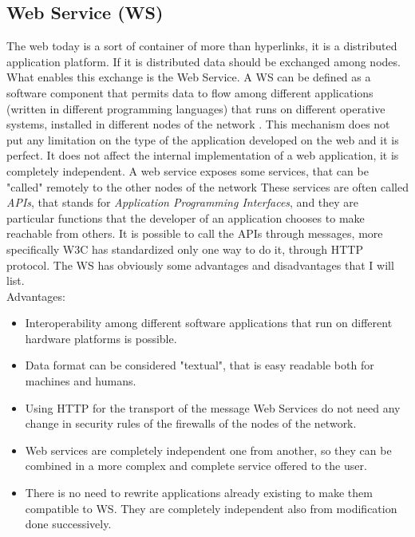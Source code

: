 \subsection{Web Service (WS)} 
The web today is a sort of container of more than hyperlinks, it is a distributed application platform. If it is distributed data should be exchanged among nodes. What enables this exchange is the Web Service. A WS can be defined as a software component that permits data to flow among different applications (written in different programming languages) that runs on different operative systems, installed in different nodes of the network \cite{alonso2004web}. This mechanism does not put any limitation on the type of the application developed on the web and it is perfect. It does not affect the internal implementation of a web application, it is completely independent. A web service exposes some services, that can be "called" remotely to the other nodes of the network These services are often called \textit{APIs}, that stands for \textit{Application Programming Interfaces}, and they are particular functions that the developer of an application chooses to make reachable from others. It is possible to call the APIs through messages, more specifically W3C has standardized only one way to do it, through HTTP protocol. The WS has obviously some advantages and disadvantages that I will list. \\
Advantages:

\begin{itemize}

	\item Interoperability among different software applications that run on different hardware platforms is possible.
	
	\item Data format can be considered "textual", that is easy readable both for machines and humans.
	
	\item  Using HTTP for the transport of the message Web Services do not need any change in security rules of the firewalls of the nodes of the network.
	
	\item Web services are completely independent one from another, so they can be combined in a more complex and complete service offered to the user.
	
	\item There is no need to rewrite applications already existing to make them compatible to WS. They are completely independent also from modification done successively.  
	
\end{itemize}

